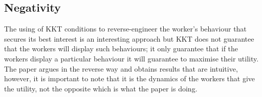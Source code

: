 \documentclass[a4paper,10pt]{article}
\theoremstyle{definition}
\begin{document}
%
%
%


\subsection*{Negativity}
The using of KKT conditions to reverse-engineer the worker's behaviour that secures its best interest is an interesting approach but KKT does not guarantee that the workers will display such behaviours; it only guarantee that if the workers display a particular behaviour it will guarantee to maximise their utility. The paper argues in the reverse way and obtains results that are intuitive, however, it is important to note that it is the dynamics of the workers that give the utility, not the opposite which is what the paper is doing.
\end{document}
